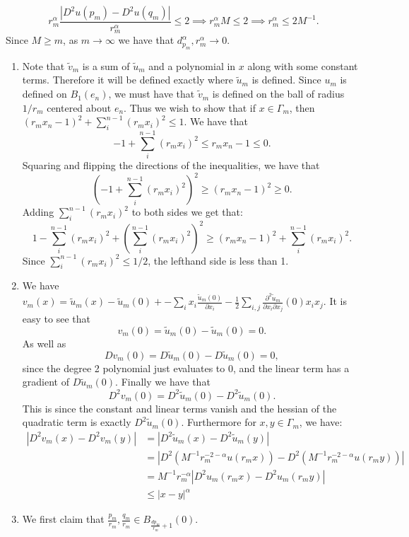 \documentclass[12pt, a4paper]{article}
\theoremstyle{definition}
\begin{document}
$$r^\alpha_m \frac{|D^2u(p_m) - D^2u(q_m)|}{r_m^\alpha}\leq 2 \implies r_m^\alpha M \leq 2 \implies r_m^\alpha \leq 2M^{-1}.$$
Since $M \geq m$, as $m \to \infty$ we have that $d_{p_m}^\alpha, r_m^\alpha \to 0$. 
\item 
\begin{enumerate}[label = \roman*) ]
	\item Note that $\tilde{v}_m$ is a sum of $\tilde{u}_m$ and a polynomial in $x$ along with some constant terms. Therefore it will be defined exactly where $\tilde{u}_m$ is defined. Since $u_m$ is defined on $B_1(e_n)$, we must have that $\tilde{v}_m$ is defined on the ball of radius $1/r_m$ centered about $e_n$. Thus we wish to show that if $x\in \Gamma_m$, then $(r_mx_n - 1)^2 + \sum_{i}^{n-1}(r_mx_i)^2 \leq 1$. 
We have that 
		$$-1 + \sum_{i}^{n-1} (r_mx_i)^2 \leq r_mx_n - 1 \leq 0.$$
Squaring and flipping the directions of the inequalities, we have that 
$$ \left(-1 + \sum_{i}^{n-1} (r_mx_i)^2  \right)^2 \geq (r_m x_n- 1)^2 \geq 0. $$
Adding $\sum_{i}^{n-1} (r_m x_i)^2$ to both sides we get that:
		$$1 - \sum_{i}^{n-1} (r_mx_i)^2  + \left(\sum_{i}^{n-1} (r_mx_i)^2 \right)^2 \geq (r_mx_n-1)^2 + \sum_{i}^{n-1}(r_mx_i)^2.$$
Since $\sum_{i}^{n-1} (r_mx_i)^2 \leq 1/2$, the lefthand side is less than 1. 
\item We have $v_m(x) =  \tilde{u}_m(x) - \tilde{u}_m(0) + - \sum_i x_i \frac{\tilde{u}_m(0)}{\partial x_i}  - \frac{1}{2} \sum_{i,j} \frac{\partial^2\tilde{u}_m}{\partial x_i \partial x_j}(0) x_ix_j.$
It is easy to see that 
$$v_m(0) = \tilde{u}_m(0) - \tilde{u}_m(0) = 0.$$
As well as
$$Dv_m(0) = D\tilde{u}_m(0) - D\tilde{u}_m(0) =0 ,$$
since the degree 2 polynomial just evaluates to $0$, and the linear term has a gradient of $D\tilde{u}_m(0)$.  
Finally we have that 
$$D^2 v_m(0) = D^2\tilde{u}_m(0) - D^2 \tilde{u}_m(0). $$
This is since the constant and linear terms vanish and the hessian of the quadratic term is exactly $D^2\tilde{u}_m(0)$. Furthermore for $x,y\in \Gamma_m$, we have:
\begin{align*}
 |D^2 v_m(x) - D^2v_m(y)| & = |D^2\tilde{u}_m(x) - D^2\tilde{u}_m(y)|
 \\ & = |D^2(M^{-1}r_m^{-2-\alpha}u(r_m x)) - D^2(M^{-1}r_m^{-2-\alpha}u(r_m y))|
 \\ & = M^{-1}r_m^{-\alpha}|D^2u_m(r_mx) - D^2u_m(r_my)|
 \\ & \leq |x-y|^\alpha \tag{by assumption at points $r_mx,r_my$}
\end{align*}
\item We first claim that $\frac{p_m}{r_m},\frac{q_m}{r_m}\in B_{\frac{dp_m}{r_m}+1}(0)$.

\end{enumerate}
\end{document}
